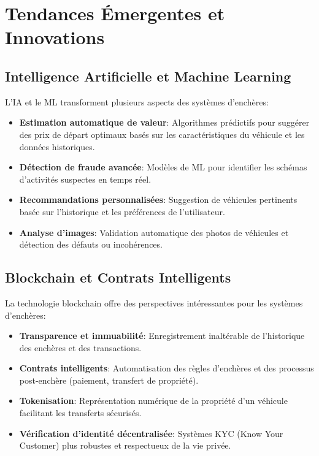 \section{Tendances Émergentes et Innovations}

\subsection{Intelligence Artificielle et Machine Learning}

L'IA et le ML transforment plusieurs aspects des systèmes d'enchères:

\begin{itemize}
    \item \textbf{Estimation automatique de valeur}: Algorithmes prédictifs pour suggérer des prix de départ optimaux basés sur les caractéristiques du véhicule et les données historiques.
    
    \item \textbf{Détection de fraude avancée}: Modèles de ML pour identifier les schémas d'activités suspectes en temps réel.
    
    \item \textbf{Recommandations personnalisées}: Suggestion de véhicules pertinents basée sur l'historique et les préférences de l'utilisateur.
    
    \item \textbf{Analyse d'images}: Validation automatique des photos de véhicules et détection des défauts ou incohérences.
\end{itemize}

\subsection{Blockchain et Contrats Intelligents}

La technologie blockchain offre des perspectives intéressantes pour les systèmes d'enchères:

\begin{itemize}
    \item \textbf{Transparence et immuabilité}: Enregistrement inaltérable de l'historique des enchères et des transactions.
    
    \item \textbf{Contrats intelligents}: Automatisation des règles d'enchères et des processus post-enchère (paiement, transfert de propriété).
    
    \item \textbf{Tokenisation}: Représentation numérique de la propriété d'un véhicule facilitant les transferts sécurisés.
    
    \item \textbf{Vérification d'identité décentralisée}: Systèmes KYC (Know Your Customer) plus robustes et respectueux de la vie privée.
\end{itemize}

